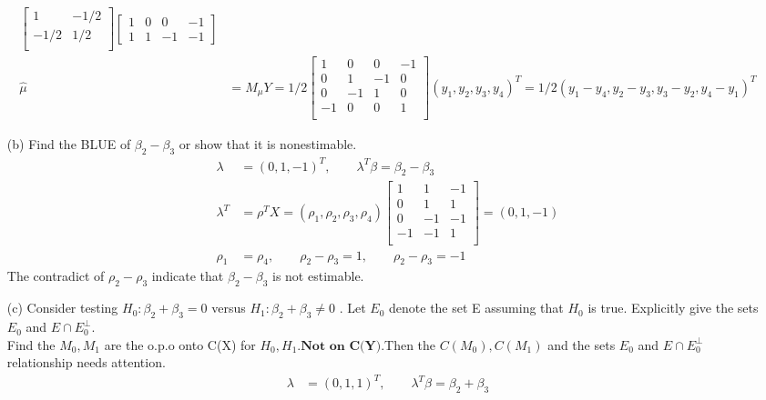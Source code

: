 \begin{itemize}
\begin{align*}
\begin{bmatrix}
           1  & -1/2   \\
           -1/2 &  1/2 \\
         \end{bmatrix}\begin{bmatrix}
           1 & 0 & 0 & -1    \\
           1 & 1 & -1 & -1
         \end{bmatrix}\\
       \hat{\mu} &= M_{\mu} Y =  1/2 \begin{bmatrix}
           1  & 0 & 0 & -1   \\
           0 &  1 & -1 & 0 \\
           0  & -1 & 1 & 0 \\
           -1 &  0 & 0 & 1 \\
         \end{bmatrix} (y_1, y_2, y_3, y_4)^T = 1/2 (y_1- y_4, y_2-y_3, y_3-y_2, y_4-y_1)^T
\end{align*}
\item[(b)] Find the BLUE of $\beta_2 - \beta_3$ or show that it is nonestimable.
\begin{align*}
    \lambda &= (0, 1,-1)^T, \qquad \lambda^T \beta = \beta_2 - \beta_3\\
    \lambda^T &= \rho^T X = (\rho_1, \rho_2, \rho_3, \rho_4)  \begin{bmatrix}
           1  & 1 & -1  \\
           0 &  1 & 1\\
           0  & -1 & -1  \\
           -1 &  -1 & 1\\
         \end{bmatrix} = (0, 1,-1)\\
         \rho_1 &= \rho_4, \qquad \rho_2 - \rho_3 = 1, \qquad \rho_2 - \rho_3 = -1
\end{align*}
The contradict of $\rho_2 - \rho_3$ indicate that  $\beta_2 - \beta_3$ is not estimable.
\item[(c)] Consider testing $H_0: \beta_2 + \beta_3 = 0$  versus $H_1: \beta_2 + \beta_3 \neq 0$ . Let $E_0$ denote the set E assuming that $H_0$ is true. Explicitly give the sets $E_0$ and $E \cap E_0^{\perp}$.\\
Find the $M_{0}, M_{1}$ are the o.p.o onto C(X) for $H_0, H_1$.$\textbf{Not on C(Y)}$.Then the $C(M_{0}), C(M_{1})$ and the sets $E_0$ and $E \cap E_0^{\perp}$ relationship needs attention.
\begin{align*}
    \lambda &= (0, 1, 1)^T, \qquad \lambda^T \beta = \beta_2 + \beta_3\\

\end{align*}
\end{itemize}
